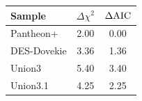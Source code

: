 \begin{tabular}{lcc}
\hline\hline
Sample & $\Delta\chi^2$ & $\Delta{\rm AIC}$ \\
\hline
Pantheon+ & 2.00 & 0.00 \\
DES-Dovekie & 3.36 & 1.36 \\
Union3 & 5.40 & 3.40 \\
Union3.1 & 4.25 & 2.25 \\
\hline\hline
\end{tabular}
